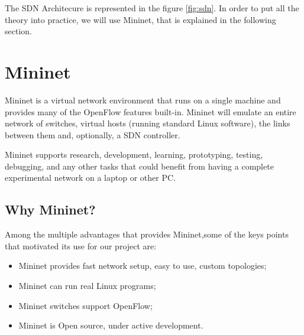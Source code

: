 \documentclass[]{report}
\begin{document}
The SDN Architecure is represented in the figure \ref{fig:sdn}. In order to put all the theory into practice, we will use Mininet, that is explained in the following section.

\begin{minipage}{\linewidth}%

\label{fig:sdn}
\end{minipage}


\section{Mininet}

Mininet is a virtual network environment that runs on a single machine and provides many of the OpenFlow features built-in. Mininet will emulate an entire network of switches, virtual hosts (running standard Linux software), the links between them and, optionally, a SDN controller.

Mininet supports research, development, learning, prototyping, testing, debugging, and any other tasks that could benefit from having a complete experimental network on a laptop or other PC.

\subsection{Why Mininet?} 
Among the multiple advantages that provides Mininet,some of the keys points that motivated its use for our project are:
\begin{itemize}
\item Mininet provides fast network setup, easy to use, custom topologies;
\item Mininet can run real Linux programs;
\item Mininet switches support OpenFlow;
\item Mininet is Open source, under active development.
\end{itemize}
\end{document}
